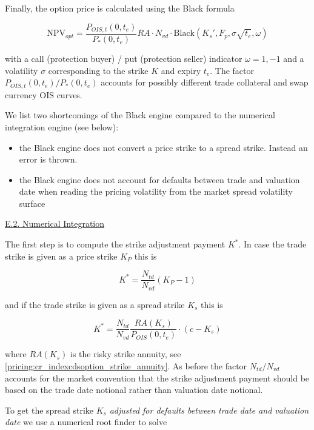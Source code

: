 Finally, the option price is calculated using the Black formula

\begin{equation}
  \text{NPV}_{opt} = \frac{P_{OIS,t}(0,t_e)}{P_{*}(0,t_e)}
                    RA\cdot N_{vd} \cdot \text{Black} \left( K_s', F_p, \sigma\sqrt{t_e}, \omega \right)
\end{equation}

with a call (protection buyer) / put (protection seller) indicator $\omega = 1, -1$ and a volatility $\sigma$
corresponding to the strike $K$ and expiry $t_e$. The factor $P_{OIS,t}(0,t_e)/P_{*}(0,t_e)$ accounts for possibly
different trade collateral and swap currency OIS curves.

We list two shortcomings of the Black engine compared to the numerical integration engine (see below):

\begin{itemize}
\item the Black engine does not convert a price strike to a spread strike. Instead an error is thrown.
\item the Black engine does not account for defaults between trade and valuation date when reading the pricing
  volatility from the market spread volatility surface
\end{itemize}

\underline{E.2. Numerical Integration}

The first step is to compute the strike adjustment payment $K^*$. In case the trade strike is given as a price strike $K_P$ this is

\begin{equation}
K^* = \frac{N_{td}}{N_{vd}}(K_P - 1)
\end{equation}

and if the trade strike is given as a spread strike $K_s$ this is

\begin{equation}
K^* = \frac{N_{td}}{N_{vd}} \frac{RA(K_s)}{P_{OIS}(0,t_e)} \cdot ( c - K_s )
\end{equation}

where $RA(K_s)$ is the risky strike annuity, see \ref{pricing:cr_indexcdsoption_strike_annuity}. As before the factor
$N_{td} / N_{vd}$ accounts for the market convention that the strike adjustment payment should be based on the trade
date notional rather than valuation date notional.

To get the spread strike $K_s$ {\em adjusted for defaults between trade date and valuation date} we use a numerical root
finder to solve

